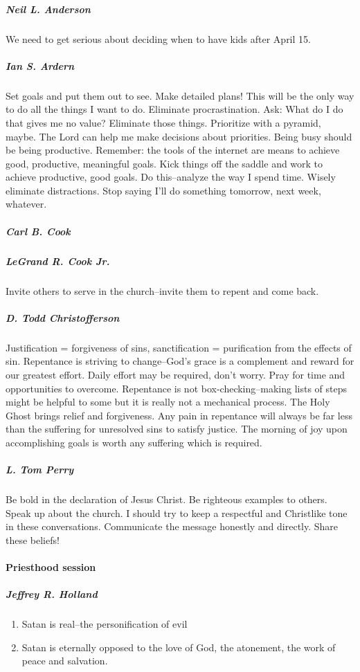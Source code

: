 \subparagraph*{Neil L. Anderson} We need to get serious about deciding when to have kids after April 15.

\subparagraph*{Ian S. Ardern} Set goals and put them out to see. Make detailed plans! This will be the only way to do all the things I want to do. Eliminate procrastination. Ask: What do I do that gives me no value? Eliminate those things. Prioritize with a pyramid, maybe. The Lord can help me make decisions about priorities. Being busy should be being productive. Remember: the tools of the internet are means to achieve good, productive, meaningful goals. Kick things off the saddle and work to achieve productive, good goals. Do this--analyze the way I spend time. Wisely eliminate distractions. Stop saying I'll do something tomorrow, next week, whatever.

\subparagraph*{Carl B. Cook}

\subparagraph*{LeGrand R. Cook Jr.} Invite others to serve in the church--invite them to repent and come back.

\subparagraph*{D. Todd Christofferson} Justification = forgiveness of sins, sanctification = purification from the effects of sin. Repentance is striving to change--God's grace is a complement and reward for our greatest effort. Daily effort may be required, don't worry. Pray for time and opportunities to overcome. Repentance is not box-checking--making lists of steps might be helpful to some but it is really not a mechanical process. The Holy Ghost brings relief and forgiveness. Any pain in repentance will always be far less than the suffering for unresolved sins to satisfy justice. The morning of joy upon accomplishing goals is worth any suffering which is required.

\subparagraph*{L. Tom Perry} Be bold in the declaration of Jesus Christ. Be righteous examples to others. Speak up about the church. I should try to keep a respectful and Christlike tone in these conversations. Communicate the message honestly and directly. Share these beliefs!

\paragraph*{Priesthood session}

\subparagraph*{Jeffrey R. Holland}

\begin{enumerate}
\item Satan is real--the personification of evil
\item Satan is eternally opposed to the love of God, the atonement, the work of peace and salvation.
\end{enumerate}

